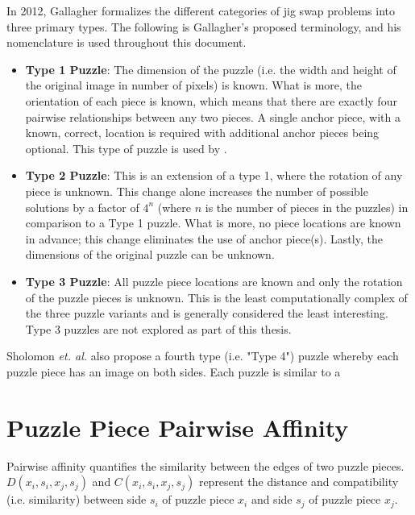 \documentclass{report}
\begin{document}
In 2012, Gallagher \cite{gallagher2012} formalizes the different categories of jig swap problems into three primary types.  The following is Gallagher's proposed terminology, and his nomenclature is used throughout this document.

\begin{itemize}

	\item \textbf{Type 1 Puzzle}: The dimension of the puzzle (i.e. the width and height of the original image in number of pixels) is known.  What is more, the orientation of each piece is known, which means that there are exactly four pairwise relationships between any two pieces.  A single anchor piece, with a known, correct, location is required with additional anchor pieces being optional.  This type of puzzle is used by \cite{cho2010, pomeranz2011}.
	
	\item \textbf{Type 2 Puzzle}: This is an extension of a type 1, where the rotation of any piece is unknown.  This change alone increases the number of possible solutions by a factor of $4^n$ (where $n$ is the number of pieces in the puzzles) in comparison to a Type 1 puzzle.  What is more, no piece locations are known in advance; this change eliminates the use of anchor piece(s).  Lastly, the dimensions of the original puzzle can be unknown.
	
	\item \textbf{Type 3 Puzzle}: All puzzle piece locations are known and only the rotation of the puzzle pieces is unknown.  This is the least computationally complex of the three puzzle variants and is generally considered the least interesting.  Type 3 puzzles are not explored as part of this thesis.

\end{itemize}

Sholomon \textit{et. al.} also propose a fourth type (i.e. "Type 4") puzzle whereby each puzzle piece has an image on both sides.  Each puzzle is similar to a 

\pagebreak
\section{Puzzle Piece Pairwise Affinity}\label{sec:piecePairwiseAffinity}

Pairwise affinity quantifies the similarity between the edges of two puzzle pieces.  $D(x_i, s_i, x_j, s_j)$ and $C(x_i, s_i, x_j, s_j)$ represent the distance and compatibility (i.e. similarity) between side $s_i$ of puzzle piece $x_i$ and side $s_j$ of puzzle piece $x_j$.  
\end{document}
